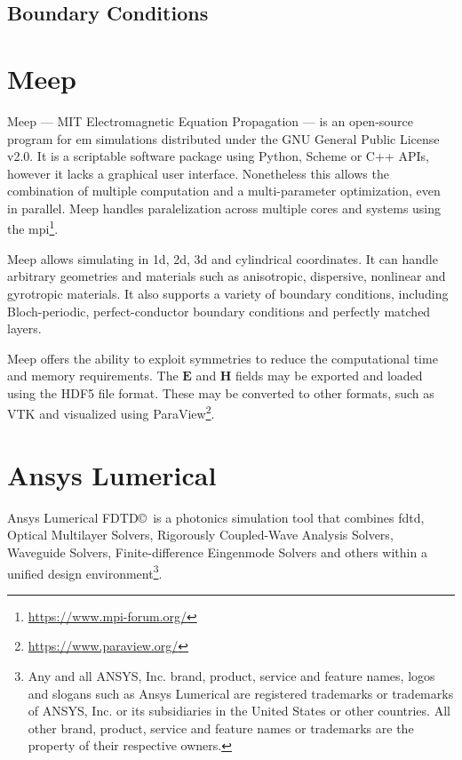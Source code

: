 \subsection{Boundary Conditions}

\section{Meep}
Meep --- MIT Electromagnetic Equation Propagation --- is an open-source program for \gls{em} simulations distributed under the GNU General Public License v2.0. It is a scriptable software package using Python, Scheme or C++ APIs, however it lacks a graphical user interface. Nonetheless this allows the combination of multiple computation and a multi-parameter optimization, even in parallel. Meep handles paralelization across multiple cores and systems using the \gls{mpi}\footnote{\url{https://www.mpi-forum.org/}}. 

Meep allows simulating in \gls{1d}, \gls{2d}, \gls{3d} and cylindrical coordinates. It can handle arbitrary geometries and materials such as anisotropic, dispersive, nonlinear and gyrotropic materials. It also supports a variety of boundary conditions, including Bloch-periodic, perfect-conductor boundary conditions and perfectly matched layers. 

Meep offers the ability to exploit symmetries to reduce the computational time and memory requirements. The $\mathbf{E}$ and $\mathbf{H}$ fields may be exported and loaded using the HDF5 file format. These may be converted to other formats, such as VTK and visualized using ParaView\footnote{\url{https://www.paraview.org/}}. 

\section{Ansys Lumerical}
Ansys Lumerical FDTD\copyright \ is a photonics simulation tool that combines \gls{fdtd}, Optical Multilayer Solvers, Rigorously Coupled-Wave Analysis Solvers, Waveguide Solvers, Finite-difference Eingenmode Solvers and others within a unified design environment\footnote{Any and all ANSYS, Inc. brand, product, service and feature names, logos and slogans such as Ansys Lumerical are registered trademarks or trademarks of ANSYS, Inc. or its subsidiaries in the United States or other countries. All other brand, product, service and feature names or trademarks are the property of their respective owners.}.


